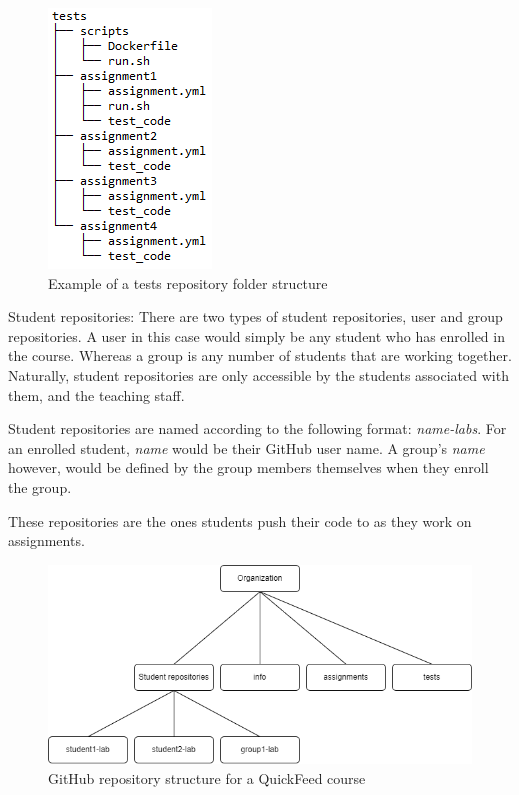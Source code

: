 \begin{figure}[ht]
    \centering
    \includegraphics[scale=0.8]{photos/tests-repository-structure.PNG}
    \caption{Example of a tests repository folder structure}
    \label{fig:tests-repository-structure}
\end{figure}

Student repositories: There are two types of student repositories, user and group repositories.
A user in this case would simply be any student who has enrolled in the course.
Whereas a group is any number of students that are working together.
Naturally, student repositories are only accessible by the students associated with them, and the teaching staff.

Student repositories are named according to the following format: \textit{name-labs}.
For an enrolled student, \textit{name} would be their GitHub user name.
A group's \textit{name} however, would be defined by the group members themselves when they enroll the group.

These repositories are the ones students push their code to as they work on assignments.

\begin{figure}[ht]
    \centering
    \includegraphics[width=\textwidth]{photos/qf-repository-structure.png}
    \caption{GitHub repository structure for a QuickFeed course}
    \label{fig:qf-repository-structure}
\end{figure}

